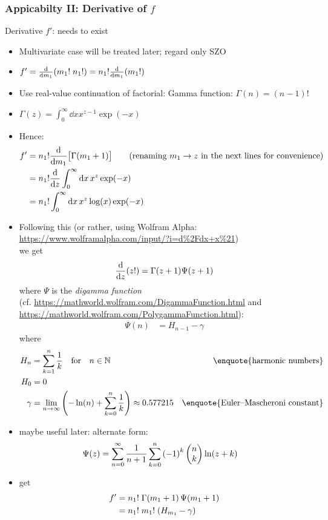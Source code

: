\documentclass[
	english,
	a4paper,
	fontsize=10pt,
	parskip=half,
	titlepage=true,
	DIV=12,
	final
]{scrreprt}
\newcommand*{\thus}{\ensuremath{\rightarrow}\xspace}
\newcommand*{\setNaturals} {\ensuremath{\mathbb{N}}}
\begin{document}
\subsubsection{Appicabilty II: Derivative of $f$}
Derivative $f'$: needs to exist
\begin{itemize}
\item Multivariate case will be treated later; regard only SZO
\item $f' = \dv{m_1} (m_1! \; n_1!) = n_1! \dv{m_1}(m_1!)$
\item Use real-value continuation of factorial: Gamma function: $\Gamma(n) = (n-1)!$
\item $\Gamma(z) = \int_{0}^{\infty} \dd{x} x^{z-1} \exp(-x)$
\item Hence:
\begin{align}
	f'
&=
	n_1! \dv{m_1}\qty[ \big. \Gamma(m_1 + 1) ] 
	\qquad\text{(renaming } m_1 \thus z \text{ in the next lines for convenience)}
	\\
&=
	n_1! \dv{z}
	\int_{0}^{\infty} \dd{x} 
		x^{z} \exp(-x)
	\\
&=
	n_1!
	\int_{0}^{\infty} \dd{x}
		x^{z} \log(x) \exp(-x)
\end{align}	
\item Following this (or rather, using Wolfram Alpha: \\
	\url{https://www.wolframalpha.com/input/?i=d%2Fdx+x%21})	 \\
	we get
\begin{align}
	\dv{z}(z!) = \Gamma(z + 1) \Psi(z + 1)
\end{align}
	where $\Psi$ is the \emph{digamma function}\\
	(cf. \url{https://mathworld.wolfram.com/DigammaFunction.html} and \\
	     \url{https://mathworld.wolfram.com/PolygammaFunction.html}):
\begin{align}
	\Psi(n)
&=
	H_{n-1} - \gamma
\end{align}
where
\begin{align}
	H_{n}
&=
	\sum_{k=1}^{n}
		\frac{1}{k}
	\qfor{} n \in \setNaturals
&
	\text{\enquote{harmonic numbers}}
\\
	H_0
&=
	0
\\
	\gamma
&=
	\lim_{n \to \infty} \qty(
		-\ln(n)
		+ \sum_{k=0}^{n}
			\frac{1}{k}
	)
\approx
	0.577215
&
	\text{\enquote{Euler–Mascheroni constant}}
\end{align}

\item maybe useful later: alternate form:
\begin{align}
	\Psi(z)
&=
	\sum_{n=0}^{\infty}
		\frac{1}{n+1}
	\sum_{k=0}^{n}
		\qty(-1)^{k}
		\begin{pmatrix}
			n \\ k
		\end{pmatrix}
		\ln(z + k)
\end{align}
\item get
\begin{align}
	f'
&=
	n_1 ! \;
	\Gamma(m_1 + 1) \,
	\Psi  (m_1 + 1) \\
&=
	n_1 ! \; m_1 ! \;
	\qty( H_{m_1} - \gamma )
\end{align}
\end{itemize}
\end{document}

